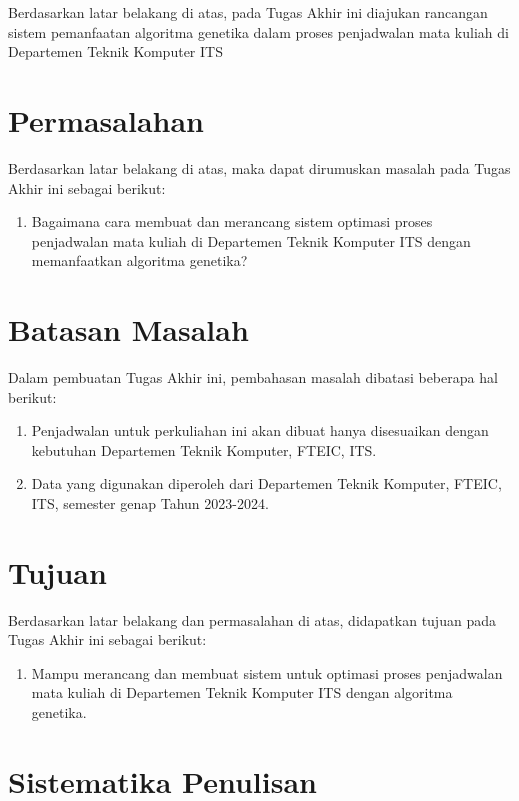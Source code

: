 Berdasarkan latar belakang di atas, pada Tugas Akhir ini diajukan rancangan sistem pemanfaatan algoritma genetika dalam proses penjadwalan mata kuliah di Departemen Teknik Komputer ITS
\section{Permasalahan}
\label{sec:permasalahan}

Berdasarkan latar belakang di atas, maka dapat dirumuskan masalah pada Tugas Akhir ini sebagai berikut:
\begin{enumerate}
    \item Bagaimana cara membuat dan merancang sistem optimasi proses penjadwalan mata kuliah di Departemen Teknik Komputer ITS dengan memanfaatkan algoritma genetika?
\end{enumerate}
\section{Batasan Masalah}
\label{sec:batasanmasalah}

Dalam pembuatan Tugas Akhir ini, pembahasan masalah dibatasi beberapa hal berikut:
\begin{enumerate}
    \item Penjadwalan untuk perkuliahan ini akan dibuat hanya disesuaikan dengan kebutuhan Departemen Teknik Komputer, FTEIC, ITS.
    \item Data yang digunakan diperoleh dari Departemen Teknik Komputer, FTEIC, ITS, semester genap Tahun 2023-2024.
\end{enumerate}

\section{Tujuan}
\label{sec:Tujuan}

Berdasarkan latar belakang dan permasalahan di atas, didapatkan tujuan pada Tugas Akhir ini sebagai berikut:
\begin{enumerate}
    \item Mampu merancang dan membuat sistem untuk optimasi proses penjadwalan mata kuliah di Departemen Teknik Komputer ITS dengan algoritma genetika.
\end{enumerate}

\section{Sistematika Penulisan}
\label{sec:sistematikapenulisan}

